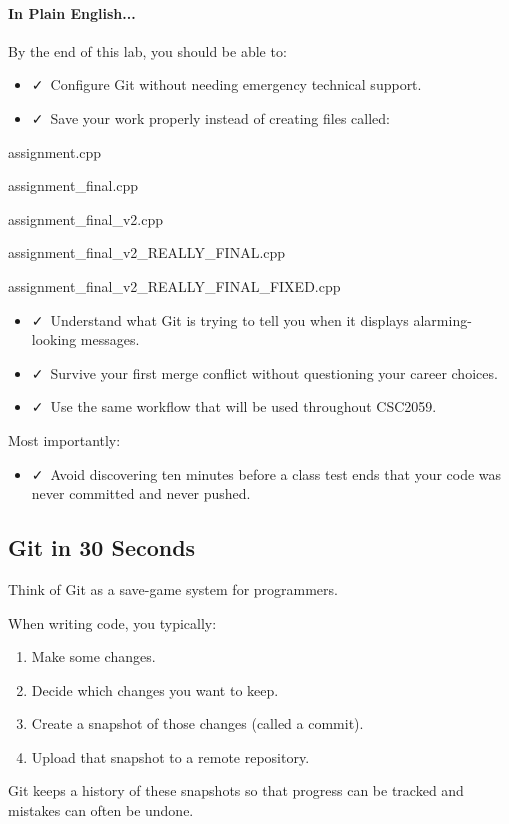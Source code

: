 \documentclass{csc2059practical}
\begin{document}
\paragraph{In Plain English...}
By the end of this lab, you should be able to:

\begin{itemize}
  \item \faCheck\ Configure Git without needing emergency technical support.
  \item \faCheck\ Save your work properly instead of creating files called:
\end{itemize}
\begin{terminalplain}
assignment.cpp

assignment\_final.cpp

assignment\_final\_v2.cpp

assignment\_final\_v2\_REALLY\_FINAL.cpp

assignment\_final\_v2\_REALLY\_FINAL\_FIXED.cpp
\end{terminalplain}
\begin{itemize}
  \item \faCheck\ Understand what Git is trying to tell you when it displays alarming-looking messages.
  \item \faCheck\ Survive your first merge conflict without questioning your career choices.
  \item \faCheck\ Use the same workflow that will be used throughout CSC2059.
\end{itemize}
Most importantly:

\begin{itemize}
  \item \faCheck\ Avoid discovering ten minutes before a class test ends that your code was never committed and never pushed.
\end{itemize}
\subsection*{Git in 30 Seconds}
Think of Git as a save-game system for programmers.

When writing code, you typically:

\begin{enumerate}
  \item Make some changes.
  \item Decide which changes you want to keep.
  \item Create a snapshot of those changes (called a commit).
  \item Upload that snapshot to a remote repository.
\end{enumerate}
Git keeps a history of these snapshots so that progress can be tracked and mistakes can often be undone.
\end{document}
